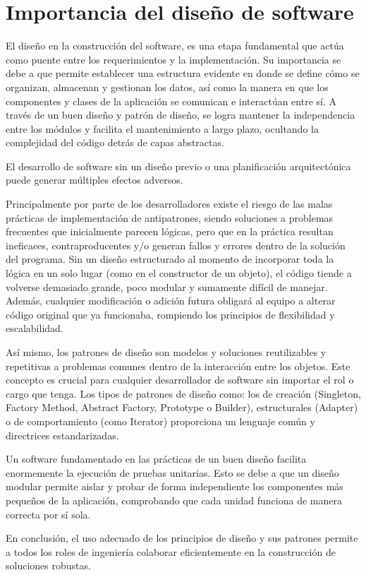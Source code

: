 \section{Importancia del diseño de software}
El diseño en la construcción del software, es una etapa fundamental que actúa como puente entre los requerimientos y la implementación. Su importancia se debe a que permite establecer una estructura evidente en donde se define cómo se organizan, almacenan y gestionan los datos, así como la manera en que los componentes y clases de la aplicación se comunican e interactúan entre sí. A través de un buen diseño y patrón de diseño, se logra mantener la independencia entre los módulos y facilita el mantenimiento a largo plazo, ocultando la complejidad del código detrás de capas abstractas.

El desarrollo de software sin un diseño previo o una planificación arquitectónica puede generar múltiples efectos adversos. 

Principalmente por parte de los desarrolladores existe el riesgo de las malas prácticas de implementación de antipatrones, siendo soluciones a problemas frecuentes que inicialmente parecen lógicas, pero que en la práctica resultan ineficaces, contraproducentes y/o generan fallos y errores dentro de la solución del programa. Sin un diseño estructurado al momento de incorporar toda la lógica en un solo lugar (como en el constructor de un objeto), el código tiende a volverse demasiado grande, poco modular y sumamente difícil de manejar. Además, cualquier modificación o adición futura obligará al equipo a alterar código original que ya funcionaba, rompiendo los principios de flexibilidad y escalabilidad.

Así mismo, los patrones de diseño son modelos y soluciones reutilizables y repetitivas a problemas comunes dentro de la interacción entre los objetos. Este concepto es crucial para cualquier desarrollador de software sin importar el rol o cargo que tenga. Los tipos de patrones de diseño como: los de creación (Singleton, Factory Method, Abstract Factory, Prototype o Builder), estructurales (Adapter) o de comportamiento (como Iterator) proporciona un lenguaje común y directrices estandarizadas.

Un software fundamentado en las prácticas de un buen diseño facilita enormemente la ejecución de pruebas unitarias. Esto se debe a que un diseño modular permite aislar y probar de forma independiente los componentes más pequeños de la aplicación, comprobando que cada unidad funciona de manera correcta por sí sola.

En conclusión, el uso adecuado de los principios de diseño y sus patrones permite a todos los roles de ingeniería colaborar eficientemente en la construcción de soluciones robustas.
\newpage